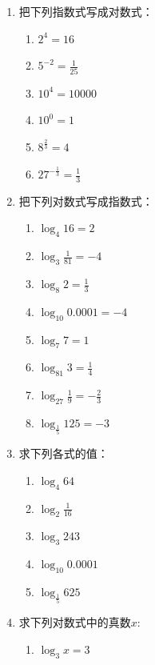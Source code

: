 \begin{ex}
\begin{enumerate}
    \item 把下列指数式写成对数式：
\begin{multicols}{3}
\begin{enumerate}[(1)]
    \item $2^4=16$
    \item $5^{-2}=\frac{1}{25}$
    \item $10^4=10000$
    \item $10^0=1$
    \item $8^{\tfrac{2}{3}}=4$
    \item $27^{-\tfrac{1}{3}}=\frac{1}{3}$
\end{enumerate}
\end{multicols}
    \item 把下列对数式写成指数式：
\begin{multicols}{2}
    \begin{enumerate}[(1)]
        \item $\log_4 16=2$
        \item $\log_3\frac{1}{81}=-4$
        \item $\log_8 2=\frac{1}{3}$
        \item $\log_{10}0.0001=-4$
        \item $\log_7 7 =1$
        \item $\log_{81} 3=\frac{1}{4}$
        \item $\log_{27}\frac{1}{9}=-\frac{2}{3}$
        \item $\log_{\tfrac{1}{5}}125=-3$
    \end{enumerate}
\end{multicols}
    \item 求下列各式的值：
\begin{multicols}{3}
    \begin{enumerate}[(1)]
\item $\log_4 64$
\item $\log_2 \frac{1}{16}$
\item $\log_3 243$
\item $\log_{10}0.0001$
\item $\log_{\tfrac{1}{5}}625$
    \end{enumerate}
\end{multicols}
    \item 求下列对数式中的真数$x$:
\begin{multicols}{2}
    \begin{enumerate}[(1)]
        \item $\log_3 x=3$

\end{enumerate}
\end{multicols}
\end{enumerate}
\end{ex}
